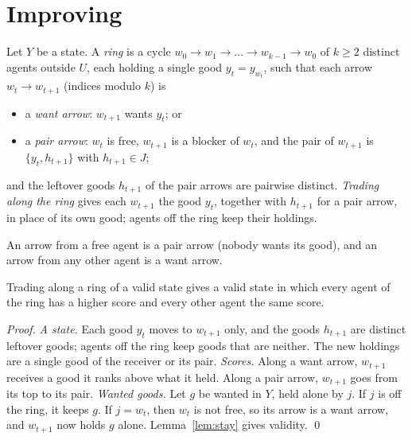 \documentclass[runningheads,11pt]{llncs}
\begin{document}
\section{Improving}\label{sec:improve}

\begin{definition}[rings]\label{def:ring}
Let $Y$ be a state. A \emph{ring} is a cycle $w_0\to w_1\to\dots\to w_{k-1}\to w_0$ of $k\ge2$ distinct agents outside $U$, each holding a single good $y_t=y_{w_t}$, such that each arrow $w_t\to w_{t+1}$ (indices modulo $k$) is
\begin{itemize}
\item a \emph{want arrow}: $w_{t+1}$ wants $y_t$; or
\item a \emph{pair arrow}: $w_t$ is free, $w_{t+1}$ is a blocker of $w_t$, and the pair of $w_{t+1}$ is $\{y_t,h_{t+1}\}$ with $h_{t+1}\in J$;
\end{itemize}
and the leftover goods $h_{t+1}$ of the pair arrows are pairwise distinct. \emph{Trading along the ring} gives each $w_{t+1}$ the good $y_t$, together with $h_{t+1}$ for a pair arrow, in place of its own good; agents off the ring keep their holdings.
\end{definition}

\noindent An arrow from a free agent is a pair arrow (nobody wants its good), and an arrow from any other agent is a want arrow.

\begin{lemma}[ring]\label{lem:ring}
Trading along a ring of a valid state gives a valid state in which every agent of the ring has a higher score and every other agent the same score.
\end{lemma}

\begin{proof}
\emph{A state.} Each good $y_t$ moves to $w_{t+1}$ only, and the goods $h_{t+1}$ are distinct leftover goods; agents off the ring keep goods that are neither. The new holdings are a single good of the receiver or its pair.
\emph{Scores.} Along a want arrow, $w_{t+1}$ receives a good it ranks above what it held. Along a pair arrow, $w_{t+1}$ goes from its top to its pair.
\emph{Wanted goods.} Let $g$ be wanted in $Y$, held alone by $j$. If $j$ is off the ring, it keeps $g$. If $j=w_t$, then $w_t$ is not free, so its arrow is a want arrow, and $w_{t+1}$ now holds $g$ alone. Lemma~\ref{lem:stay} gives validity. \qed
\end{proof}
\end{document}
